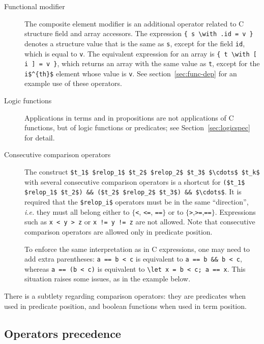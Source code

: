 \begin{description}
\item[Functional modifier]
  The composite element modifier is an additional
  operator related to C structure field and array accessors.
  The expression \lstinline|{ s \with .id = v }|
  denotes a structure value that is the same as \lstinline|s|, except for the field
  \lstinline|id|, which is equal to \lstinline|v|.
  The equivalent expression for an array is
  \lstinline|{ t \with [ i ] = v }|,
  which returns an array with the same value as \lstinline|t|, except for the
  \lstinline|i$^{th}$| element whose value
  is \lstinline|v|.
  See section~\ref{sec:func-dep} for an example use of these operators.

\item[Logic functions] Applications in terms and in propositions are not
applications of C functions, but of logic functions or predicates; see
Section~\ref{sec:logicspec} for detail.

\item[Consecutive comparison operators]
  The construct
\lstinline|$t_1$ $relop_1$ $t_2$ $relop_2$ $t_3$ $\cdots$ $t_k$| with
  several consecutive comparison operators is a shortcut for
  \lstinline|($t_1$ $relop_1$ $t_2$) && ($t_2$ $relop_2$ $t_3$) && $\cdots$|.
  It is required that the \lstinline|$relop_i$| operators must be in
  the same ``direction'', \emph{i.e.} they must all belong either to
  $\{$\lstinline|<|, \lstinline|<=|, \lstinline|==|$\}$ or to
  $\{$\lstinline|>|,\lstinline|>=|,\lstinline|==|$\}$. Expressions such as
  \lstinline|x < y > z| or \lstinline|x != y != z| are not allowed.
  Note that consecutive comparison operators are allowed only 
  in predicate position.

  To enforce the same interpretation as in C expressions, one may need
  to add extra parentheses: \lstinline|a == b < c| is equivalent
  to \lstinline|a == b && b < c|, whereas
  \lstinline |a == (b < c)| is
  equivalent to \lstinline|\let x = b < c; a == x|.
  This situation raises some issues, as in the example below.

\end{description}

There is a subtlety regarding comparison operators: they are
predicates when used in predicate position, and boolean functions when
used in term position.
\begin{example}

\end{example}

\subsection{Operators precedence}

